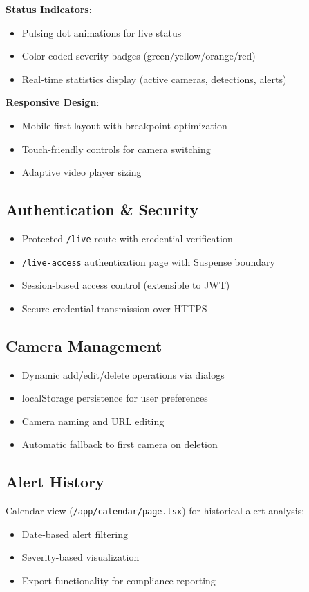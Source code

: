 \documentclass[conference]{IEEEtran}
\begin{document}
\textbf{Status Indicators}:
\begin{itemize}
    \item Pulsing dot animations for live status
    \item Color-coded severity badges (green/yellow/orange/red)
    \item Real-time statistics display (active cameras, detections, alerts)
\end{itemize}

\textbf{Responsive Design}:
\begin{itemize}
    \item Mobile-first layout with breakpoint optimization
    \item Touch-friendly controls for camera switching
    \item Adaptive video player sizing
\end{itemize}

\subsection{Authentication \& Security}
\begin{itemize}
    \item Protected \texttt{/live} route with credential verification
    \item \texttt{/live-access} authentication page with Suspense boundary
    \item Session-based access control (extensible to JWT)
    \item Secure credential transmission over HTTPS
\end{itemize}

\subsection{Camera Management}
\begin{itemize}
    \item Dynamic add/edit/delete operations via dialogs
    \item localStorage persistence for user preferences
    \item Camera naming and URL editing
    \item Automatic fallback to first camera on deletion
\end{itemize}

\subsection{Alert History}
Calendar view (\texttt{/app/calendar/page.tsx}) for historical alert analysis:
\begin{itemize}
    \item Date-based alert filtering
    \item Severity-based visualization
    \item Export functionality for compliance reporting
\end{itemize}
\end{document}
